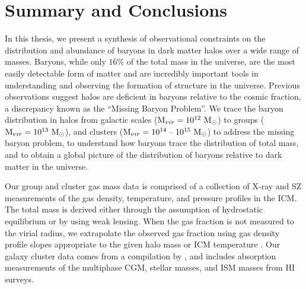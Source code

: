 \chapter{Summary and Conclusions}
\label{chap:Conclusions}

In this thesis, we present a synthesis of observational constraints on
the distribution and abundance of baryons in dark matter halos over a
wide range of masses. Baryons, while only $16\%$ of the total mass in
the universe, are the most easily detectable form of matter and are
incredibly important tools in understanding and observing the
formation of structure in the universe. Previous observations suggest
halos are deficient in baryons relative to the cosmic fraction, a
discrepancy known as the ``Missing Baryon Problem''. We trace the
baryon distribution in halos from galactic scales ($\textrm{M\ensuremath{_{vir}}}{} =
10^{12}~\textrm{M}_\odot$) to groups ($\textrm{M\ensuremath{_{vir}}}{}=10^{13}~\textrm{M}_\odot$), and clusters
($\textrm{M\ensuremath{_{vir}}}{} = 10^{14}\;\textrm{--}\;10^{15}~\textrm{M}_\odot$) to address the missing baryon
problem, to understand how baryons trace the distribution of total
mass, and to obtain a global picture of the distribution of baryons
relative to dark matter in the universe.

Our group and cluster gas mass data is comprised of a collection of
X-ray and SZ measurements of the gas density, temperature, and
pressure profiles in the ICM. The total mass is derived either through
the assumption of hydrostatic equilibrium or by using weak
lensing. When the gas fraction is not measured to the virial radius,
we extrapolate the observed gas fraction using gas density profile
slopes appropriate to the given halo mass or ICM temperature
\citep{Rasheed2011}. Our galaxy cluster data comes from a compilation
by \citet{Werk2014}, and includes absorption measurements of the
multiphase CGM, stellar masses, and ISM masses from HI surveys.

